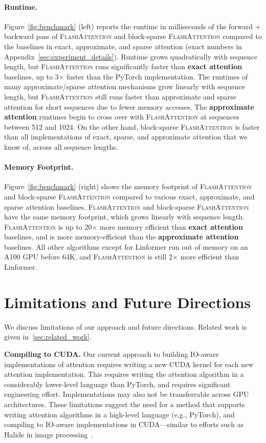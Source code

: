 \documentclass{article}
\newcommand{\sysname}{\textsc{FlashAttention}\xspace}
\begin{document}
\paragraph{Runtime.}
Figure~\ref{fig:benchmark} (left) reports the runtime in milliseconds of the forward + backward pass of \sysname and block-sparse \sysname compared to the baselines in exact, approximate, and sparse attention (exact numbers in Appendix~\ref{sec:experiment_details}).
Runtime grows quadratically with sequence length, but \sysname runs significantly faster than \textbf{exact attention} baselines, up to 3$\times$ faster than the PyTorch implementation.
The runtimes of many approximate/sparse attention mechanisms grow linearly with sequence length, but \sysname still runs faster than approximate and sparse attention for short sequences due to fewer memory accesses.
The \textbf{approximate attention} runtimes begin to cross over with \sysname at sequences between 512 and 1024.
On the other hand, block-sparse \sysname is faster than all implementations of exact, sparse, and approximate attention that we know of, across all sequence lengths.

\paragraph{Memory Footprint.}
Figure~\ref{fig:benchmark} (right) shows the memory footprint of \sysname and block-sparse \sysname compared to various exact, approximate, and sparse attention baselines.
\sysname and block-sparse \sysname have the same memory footprint, which grows linearly with sequence length.
\sysname is up to 20$\times$ more memory efficient than \textbf{exact attention} baselines, and is more memory-efficient than the \textbf{approximate attention} baselines.
All other algorithms except for Linformer run out of memory on an A100 GPU before 64K, and \sysname is still 2$\times$ more efficient than Linformer.

\section{Limitations and Future Directions}
\label{sec:discussion}

We discuss limitations of our approach and future directions. Related work is given in~\cref{sec:related_work}.

\textbf{Compiling to CUDA.} Our current approach to building IO-aware implementations of attention requires writing a new CUDA kernel for each new attention implementation.
This requires writing the attention algorithm in a considerably lower-level language than PyTorch, and requires significant engineering effort.
Implementations may also not be transferrable across GPU architectures.
These limitations suggest the need for a method that supports writing attention
algorithms in a high-level language (e.g., PyTorch), and compiling to IO-aware implementations in CUDA---similar to efforts such as Halide in image processing~\citep{ragan2013halide}.
\end{document}
